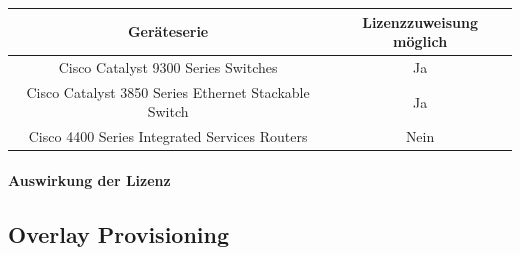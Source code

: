 \begin{tabular}{ | c | c | }
	\textbf{Geräteserie} & 	\textbf{Lizenzzuweisung möglich} \\
	\hline
	Cisco Catalyst 9300 Series Switches & Ja \\
	Cisco Catalyst 3850 Series Ethernet Stackable Switch & Ja \\
	Cisco 4400 Series Integrated Services Routers & Nein \\
\end{tabular}

\paragraph{Auswirkung der Lizenz}


\subsection{Overlay Provisioning}
